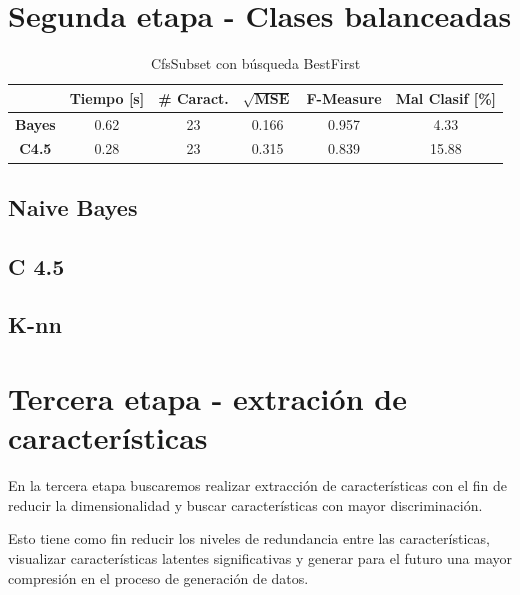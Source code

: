 \documentclass[12pt,a4paper,titlepage]{report}
\begin{document}
\section{Segunda etapa - Clases balanceadas}

\begin{table}[H]
\centering
	\begin{tabular}{c|c|c|c|c|c|} 
	\cline{2-6}
	& \multicolumn{1}{c|}{\cellcolor[gray]{0.7} \textbf{Tiempo [s]}} 
	& \multicolumn{1}{c|}{\cellcolor[gray]{0.7} \textbf{\# Caract.}} 
	& \multicolumn{1}{c|}{\cellcolor[gray]{0.7} $\mathbf{\sqrt{MSE}}$}
	& \multicolumn{1}{c|}{\cellcolor[gray]{0.7} \textbf{F-Measure}}
	& \multicolumn{1}{c|}{\cellcolor[gray]{0.7} \textbf{Mal Clasif [\%]}} \\ \hline
	
	\multicolumn{1}{|c|}{\cellcolor[gray]{0.8} \textbf{Bayes}} & 0.62 & 23 & 0.166 & 0.957 & \cellcolor[gray]{0.9}4.33  \\ \hline
	\multicolumn{1}{|c|}{\cellcolor[gray]{0.8} \textbf{C4.5}}  & 0.28 & 23 & 0.315 & 0.839 & \cellcolor[gray]{0.9}15.88 \\ \hline
	\end{tabular} 
	\caption{CfsSubset con búsqueda BestFirst}
	\label{tab:cfssubset}
\end{table}



\subsection{Naive Bayes}

\subsection{C 4.5}

\subsection{K-nn}

\section{Tercera etapa - extración de características}

En la tercera etapa buscaremos realizar extracción de características con el fin de reducir la dimensionalidad y  buscar características con mayor discriminación. 

Esto tiene como fin reducir los niveles de redundancia entre las características, visualizar características latentes significativas y generar para el futuro una mayor compresión en el proceso de generación de datos. 
\end{document}
